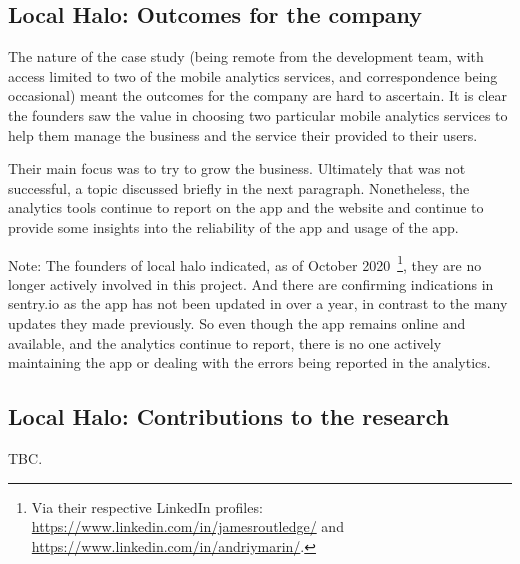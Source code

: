 \subsection{Local Halo: Outcomes for the company}
The nature of the case study (being remote from the development team, with access limited to two of the mobile analytics services, and correspondence being occasional) meant the outcomes for the company are hard to ascertain. It is clear the founders saw the value in choosing two particular mobile analytics services to help them manage the business and the service their provided to their users. 

Their main focus was to try to grow the business. Ultimately that was not successful, a topic discussed briefly in the next paragraph. Nonetheless, the analytics tools continue to report on the app and the website and continue to provide some insights into the reliability of the app and usage of the app.

Note: The founders of local halo indicated, as of October 2020~\footnote{Via their respective LinkedIn profiles: \url{https://www.linkedin.com/in/jamesroutledge/} and \url{https://www.linkedin.com/in/andriymarin/}.}, they are no longer actively involved in this project. And there are confirming indications in sentry.io as the app has not been updated in over a year, in contrast to the many updates they made previously. So even though the app remains online and available, and the analytics continue to report, there is no one actively maintaining the app or dealing with the errors being reported in the analytics.

\subsection{Local Halo: Contributions to the research}
TBC.

\clearpage


